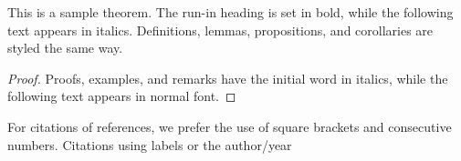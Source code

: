 \documentclass[runningheads]{llncs}
\begin{document}
\begin{theorem}
This is a sample theorem. The run-in heading is set in bold, while
the following text appears in italics. Definitions, lemmas,
propositions, and corollaries are styled the same way.
\end{theorem}
%
%
\begin{proof}
Proofs, examples, and remarks have the initial word in italics,
while the following text appears in normal font.
\end{proof}
For citations of references, we prefer the use of square brackets
and consecutive numbers. Citations using labels or the author/year


\end{document}
